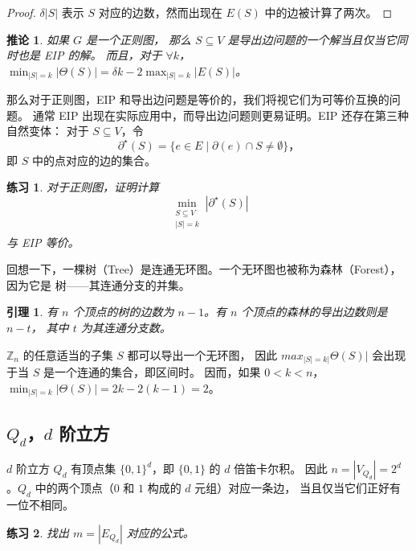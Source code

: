 \documentclass[12pt, a4paper]{article}
\newtheorem{lemma}{引理}
\newtheorem{corollary}{推论}
\newtheorem{exercise}{练习}
\begin{document}
\begin{proof}
$\delta|S|$ 表示 $S$ 对应的边数，然而出现在 $E(S)$ 中的边被计算了两次。
\end{proof}

\begin{corollary}
\label{Corollary 1}
如果 $G$ 是一个正则图，
那么 $S \subseteq V$ 是导出边问题的一个解当且仅当它同时也是 EIP 的解。
而且，对于 $\forall k$，$\min_{|S| = k}|\Theta(S)| = \delta k − 2\max_{|S| = k}|E(S)|$。
\end{corollary}

那么对于正则图，EIP 和导出边问题是等价的，我们将视它们为可等价互换的问题。
通常 EIP 出现在实际应用中，而导出边问题则更易证明。EIP 还存在第三种自然变体：
对于 $S \subseteq V$，令
$$\partial^\star(S) = \{e \in E \mid \partial(e) \cap S \neq \emptyset\}，$$
即 $S$ 中的点对应的边的集合。

\begin{exercise}
\label{Exercise 1}
对于正则图，证明计算
$$\min_{\substack{
	S \subseteq V \\
	|S| = k \\
}}|\partial^\star(S)|$$
与 EIP 等价。
\end{exercise}

回想一下，一棵树（Tree）是连通无环图。一个无环图也被称为森林（Forest），因为它是
树——其连通分支的并集。

\begin{lemma}
\label{Lemma 2}
有 $n$ 个顶点的树的边数为 $n − 1$。有 $n$ 个顶点的森林的导出边数则是 $n - t$，
其中 $t$ 为其连通分支数。
\end{lemma}

$\mathbb{Z}_n$ 的任意适当的子集 $S$ 都可以导出一个无环图，
因此 $max_{|S| = k|}\Theta(S)|$ 会出现于当 $S$ 是一个连通的集合，即区间时。
因而，如果 $0 < k < n$，$\min_{|S| = k}|\Theta(S)| = 2k − 2(k − 1) = 2$。

\subsection{$Q_d$，$d$ 阶立方}
\label{Subsection 2.3}

$d$ 阶立方 $Q_d$ 有顶点集 $\{0, 1\}^d$，即 $\{0, 1\}$ 的 $d$ 倍笛卡尔积。
因此 $n = |V_{Q_d}| = 2^d$。$Q_d$ 中的两个顶点（$0$ 和 $1$ 构成的 $d$ 元组）对应一条边，
当且仅当它们正好有一位不相同。

\begin{exercise}
\label{Exercise 2}
找出 $m = |E_{Q_d}|$ 对应的公式。
\end{exercise}
\end{document}
